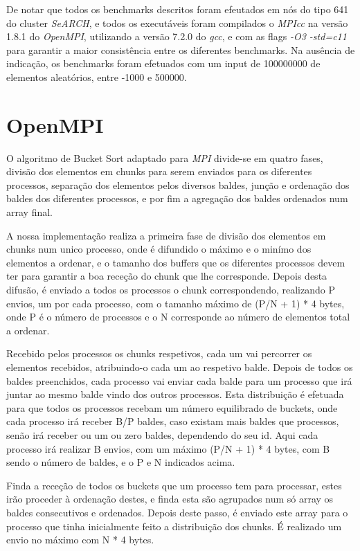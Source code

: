 \documentclass[a4paper]{report}
\begin{document}
De notar que todos os benchmarks descritos foram efeutados em nós do tipo 641 do
cluster \textit{SeARCH}, e todos os executáveis foram compilados o
\textit{MPIcc} na versão 1.8.1 do \textit{OpenMPI}, utilizando a versão
7.2.0 do \textit{gcc}, e com as flags \textit{-O3 -std=c11} para garantir 
a maior consistência entre os diferentes benchmarks. Na
ausência de indicação, os benchmarks foram efetuados com um input de 100000000
de elementos aleatórios, entre -1000 e 500000.

\chapter{OpenMPI} \label{chap:ompi}

O algoritmo de Bucket Sort adaptado para \textit{MPI} divide-se em quatro fases,
divisão dos elementos em chunks para serem enviados para os diferentes
processos, separação dos elementos pelos diversos baldes, junção e ordenação dos
baldes dos diferentes processos, e por fim a agregação dos baldes ordenados num
array final.

A nossa implementação realiza a primeira fase de divisão dos elementos em chunks
num unico processo, onde é difundido o máximo e o minímo dos elementos a
ordenar, e o tamanho dos buffers que os diferentes processos devem ter para
garantir a boa receção do chunk que lhe corresponde. Depois desta difusão, é
enviado a todos os processos o chunk correspondendo, realizando P envios, um por
cada processo, com o tamanho máximo de (P/N + 1) * 4 bytes, onde P é o número de
processos e o N corresponde ao número de elementos total a ordenar.

Recebido pelos processos os chunks respetivos, cada um vai percorrer os
elementos recebidos, atribuindo-o cada um ao respetivo balde. Depois de todos os
baldes preenchidos, cada processo vai enviar cada balde para um processo que
irá juntar ao mesmo balde vindo dos outros processos. Esta distribuição é
efetuada para que todos os processos recebam um número equilibrado de
buckets, onde cada processo irá receber B/P baldes, caso existam mais baldes
que processos, senão irá receber ou um ou zero baldes, dependendo do seu id. 
Aqui cada processo irá realizar B envios, com um máximo (P/N + 1) * 4 bytes, 
com B sendo o número de baldes, e o P e N indicados acima.

Finda a receção de todos os buckets que um processo tem para processar, estes
irão proceder à ordenação destes, e finda esta são agrupados num só array os
baldes consecutivos e ordenados. Depois deste passo, é enviado este array para o
processo que tinha inicialmente feito a distribuição dos chunks. É realizado um
envio no máximo com N * 4 bytes.
\end{document}
